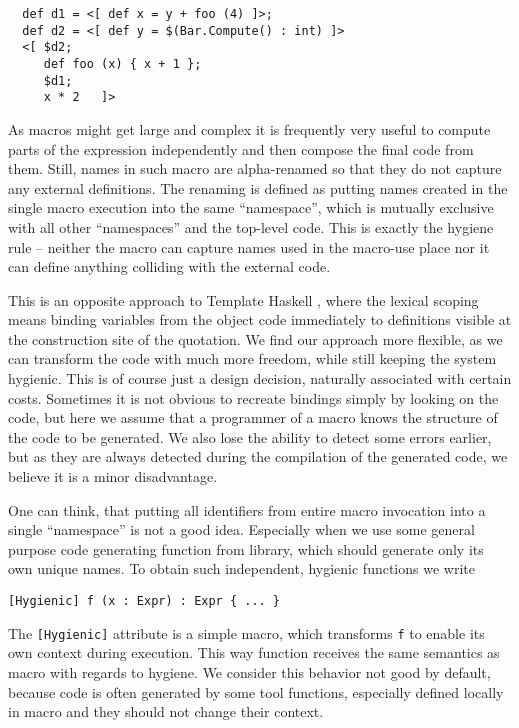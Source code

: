 \documentclass{llncs}
\begin{document}
\begin{verbatim}
  def d1 = <[ def x = y + foo (4) ]>;
  def d2 = <[ def y = $(Bar.Compute() : int) ]>
  <[ $d2;
     def foo (x) { x + 1 };
     $d1;
     x * 2   ]>
\end{verbatim}       %

As macros might get large and complex it is frequently very useful to compute
parts of the expression independently and then compose the final code from them.
Still, names in such macro are alpha-renamed so that they do not capture any 
external definitions. The renaming is defined as putting names created 
in the single macro execution into the same ``namespace'', which is
mutually exclusive with all other ``namespaces'' and the top-level code.
This is exactly the hygiene rule -- neither the macro can capture names
used in the macro-use place nor it can define anything colliding with the 
external code. 

This is an opposite approach to Template Haskell \cite{Haskell:Meta}, 
where the lexical scoping means binding variables from the object code immediately 
to definitions visible at the construction site of the quotation.
We find our approach more flexible, as we can transform the code with much
more freedom, while still keeping the system hygienic. This is of course just 
a design decision, naturally associated with certain costs. Sometimes it is not 
obvious to recreate bindings simply by looking on the code, but here we assume 
that a programmer of a macro knows the structure of the code to be generated. 
We also lose the ability to detect some errors earlier, but as they are always 
detected during the compilation of the generated code, we believe it is 
a minor disadvantage. 

One can think, that putting all identifiers from entire macro invocation into
a single ``namespace'' is not a good idea. Especially when we use some general 
purpose code generating function from library, which should generate only its 
own unique names. To obtain such independent, hygienic functions we write

\begin{verbatim}
[Hygienic] f (x : Expr) : Expr { ... }
\end{verbatim}

The \verb,[Hygienic], attribute is a simple macro, which transforms \verb,f, 
to enable its own context during execution. This way function receives the
same semantics as macro with regards to hygiene. We consider this behavior
not good by default, because code is often generated by some tool functions,
especially defined locally in macro and they should not change their context.
\end{document}
